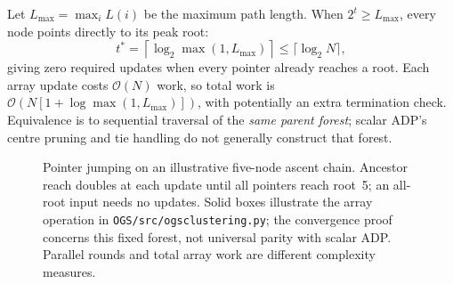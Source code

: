 Let $L_{\max} = \max_{i} L(i)$ be the maximum path length.
When $2^t \ge L_{\max}$, every node points directly to its peak root:
\begin{equation}
  t^* = \left\lceil\log_2\max(1,L_{\max})\right\rceil
  \le \lceil \log_2 N \rceil,
\end{equation}
giving zero required updates when every pointer already reaches a root.
Each array update costs $\mathcal{O}(N)$ work, so total work is
$\mathcal{O}(N[1+\log\max(1,L_{\max})])$, with potentially an extra
termination check. Equivalence is to sequential traversal of the
\emph{same parent forest}; scalar ADP's centre pruning and tie handling
do not generally construct that forest.

\begin{figure}[htbp]
  \centering
  \caption{Pointer jumping on an illustrative five-node ascent chain.
    Ancestor reach doubles at each update until all pointers reach root~5;
    an all-root input needs no updates. Solid boxes illustrate the array
    operation in \texttt{OGS/src/ogsclustering.py}; the convergence proof
    concerns this fixed forest, not universal parity with scalar ADP.
  Parallel rounds and total array work are different complexity measures.}
  \label{fig:supp_pointer_jumping}
\end{figure}

